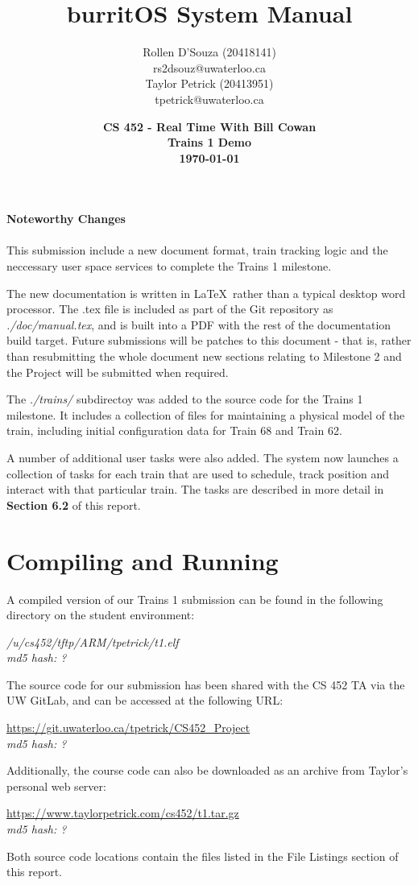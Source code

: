 \documentclass[twoside,a4paper]{refart}
\title{burritOS System Manual}
\author{Rollen D'Souza (20418141) \\
rs2dsouz@uwaterloo.ca \\
Taylor Petrick (20413951) \\
tpetrick@uwaterloo.ca \\}
\date{\textbf{CS 452 - Real Time With Bill Cowan \\ Trains 1 Demo \\ \today}}
\begin{document}
\maketitle


\textbf{Noteworthy Changes}\\\\
This submission include a new document format, train tracking logic and the neccessary user space services to complete the Trains 1 milestone.

The new documentation is written in \LaTeX\ rather than a typical desktop word processor. The .tex file is included as part of the Git repository as \textit{./doc/manual.tex}, and is built into a PDF with the rest of the documentation build target. Future submissions will be patches to this document - that is, rather than resubmitting the whole document new sections relating to Milestone 2 and the Project will be submitted when required.

The \textit{./trains/} subdirectoy was added to the source code for the Trains 1 milestone. It includes a collection of files for maintaining a physical model of the train, including initial configuration data for Train 68 and Train 62.

A number of additional user tasks were also added. The system now launches a collection of tasks for each train that are used to schedule, track position and interact with that particular train. The tasks are described in more detail in \textbf{Section 6.2} of this report.

\newpage
\tableofcontents
\newpage


\section{Compiling and Running}
A compiled version of our Trains 1 submission can be found in the following directory on the student environment:
\begin{center}
\textit{/u/cs452/tftp/ARM/tpetrick/t1.elf}\\
\textit{md5 hash: ?}
\end{center}
The source code for our submission has been shared with the CS 452 TA via the UW GitLab, and can be accessed at the following URL:
\begin{center}
\url{https://git.uwaterloo.ca/tpetrick/CS452_Project}\\
\textit{md5 hash: ?}
\end{center}
Additionally, the course code can also be downloaded as an archive from Taylor’s personal web server:
\begin{center}
\url{https://www.taylorpetrick.com/cs452/t1.tar.gz}\\
\textit{md5 hash: ?}
\end{center}
Both source code locations contain the files listed in the File Listings section of this report.
\end{document}
